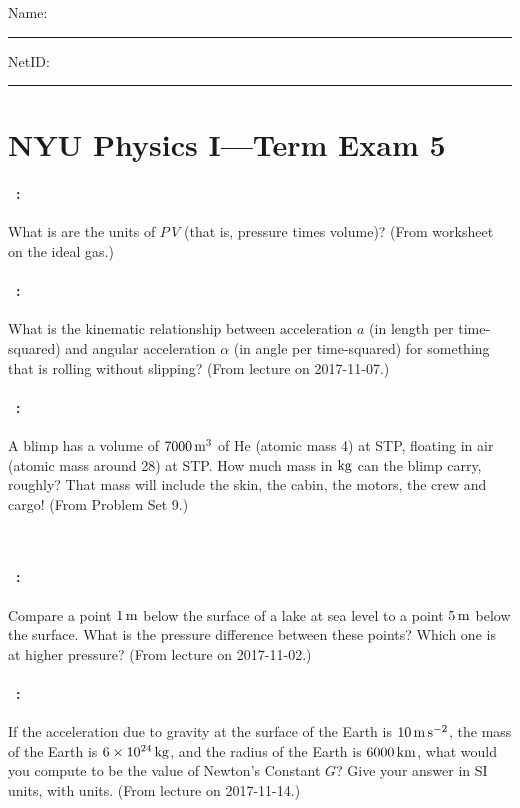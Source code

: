 \documentclass[12pt]{article} 
\begin{document}
\noindent
Name: \rule[-1ex]{0.55\textwidth}{0.1pt}
NetID: \rule[-1ex]{0.2\textwidth}{0.1pt}

\section*{NYU Physics I---Term Exam 5}

\paragraph{\problemname~\theproblem:}%
What is are the units of $P\,V$ (that is, pressure times volume)?
(From worksheet on the ideal gas.)

\vfill

\paragraph{\problemname~\theproblem:}%
What is the kinematic relationship between acceleration $a$ (in length
per time-squared) and angular acceleration $\alpha$ (in angle per
time-squared) for something that is rolling without slipping?
(From lecture on 2017-11-07.)

\vfill

\paragraph{\problemname~\theproblem:}%
A blimp has a volume of $7000\,\mathrm{m}^3$ of He (atomic mass 4) at STP,
floating in air (atomic mass around 28) at STP. How much mass in $\mathrm{kg}$
can the blimp carry, roughly? That mass will include the skin, the
cabin, the motors, the crew and cargo!
(From Problem Set 9.)

\vfill
~
\clearpage

\paragraph{\problemname~\theproblem:}%
Compare a point $1\,\mathrm{m}$ below the surface of a lake at sea level to
a point $5\,\mathrm{m}$ below the surface. What is the pressure
difference between these points? Which one is at higher pressure?
(From lecture on 2017-11-02.)

\vfill

\paragraph{\problemname~\theproblem:}%
If the acceleration due to gravity at the surface of the Earth is
$10\,\mathrm{m}\,\mathrm{s}^{-2}$, the mass of the Earth is $6\times 10^{24}\,\mathrm{kg}$, and the
radius of the Earth is $6000\,\mathrm{km}$, what would you compute to be the
value of Newton's Constant $G$? Give your answer in SI units, with units.
(From lecture on 2017-11-14.)
\end{document}
